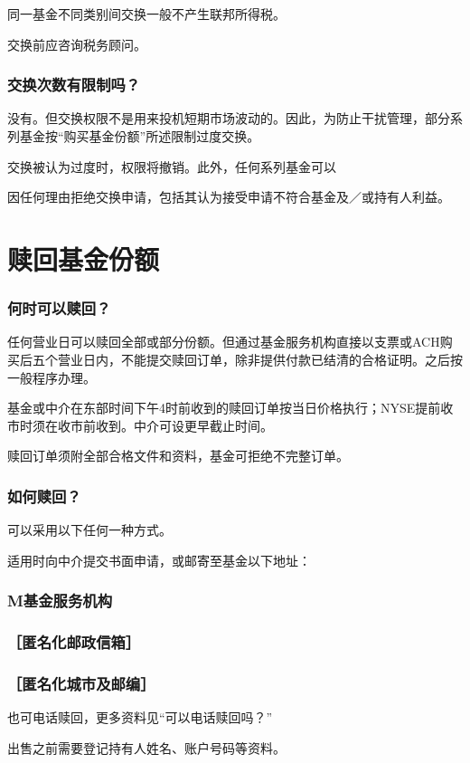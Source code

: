 \documentclass[UTF8,fontset=none,11pt,a4paper]{ctexart}
\begin{document}
同一基金不同类别间交换一般不产生联邦所得税。

交换前应咨询税务顾问。

\subsubsection*{交换次数有限制吗？}
没有。但交换权限不是用来投机短期市场波动的。因此，为防止干扰管理，部分系列基金按“购买基金份额”所述限制过度交换。

交换被认为过度时，权限将撤销。此外，任何系列基金可以

因任何理由拒绝交换申请，包括其认为接受申请不符合基金及／或持有人利益。

\section*{赎回基金份额}\label{unitU700}
\subsubsection*{何时可以赎回？}
任何营业日可以赎回全部或部分份额。但通过基金服务机构直接以支票或ACH购买后五个营业日内，不能提交赎回订单，除非提供付款已结清的合格证明。之后按一般程序办理。

基金或中介在东部时间下午4时前收到的赎回订单按当日价格执行；NYSE提前收市时须在收市前收到。中介可设更早截止时间。

赎回订单须附全部合格文件和资料，基金可拒绝不完整订单。

\subsubsection*{如何赎回？}
可以采用以下任何一种方式。

适用时向中介提交书面申请，或邮寄至基金以下地址：

\subsubsection*{M基金服务机构}
\subsubsection*{［匿名化邮政信箱］}
\subsubsection*{［匿名化城市及邮编］}
也可电话赎回，更多资料见“可以电话赎回吗？”

出售之前需要登记持有人姓名、账户号码等资料。
\end{document}
